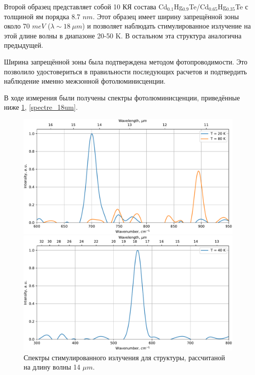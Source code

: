 \documentclass[../main.tex]{subfiles}
\begin{document}
    Второй образец представляет собой 10 КЯ состава Cd${}_{0.1}$Hg${}_{0.9}$Te/Cd${}_{0.65}$Hg${}_{0.35}$Te
    с толщиной ям порядка 8.7 $nm$.
    Этот образец имеет ширину запрещённой зоны около 70 $meV$ ($\lambda \sim 18~\mu m$) и позволяет наблюдать стимулированное 
    излучение на этой длине волны в диапазоне  20-50 K. В остальном эта структура аналогична предыдущей.

    Ширина запрещённой зоны была подтверждена методом фотопроводимости. Это позволило удостовериться в правильности последующих 
    расчетов и подтвердить наблюдение именно межзонной фотолюминисценции.

    В ходе измерения были получены спектры фотолюминисценции, приведённые ниже \ref{spectre_14um}, \ref{spectre_18um}.

    \begin{figure}[hbp!]
        \vspace{0.75cm}
        \begin{minipage}[h]{\linewidth}
            \begin{center}
                \includegraphics[width=0.75\linewidth]{./images/new_14um_spectre.pdf}

                \vspace{0.75cm}
                \caption{\label{spectre_14um}Спектры стимулированного излучения для структуры, 
                    рассчитаной на длину волны 14 $\mu m$.}
                \vspace{0.75cm}
            \end{center}
        \end{minipage}
        \begin{minipage}[h]{\linewidth}
            \begin{center}
                \includegraphics[width=0.75\linewidth]{./images/new_18um_spectre.pdf}


\end{center}
\end{minipage}
\end{figure}
\end{document}
